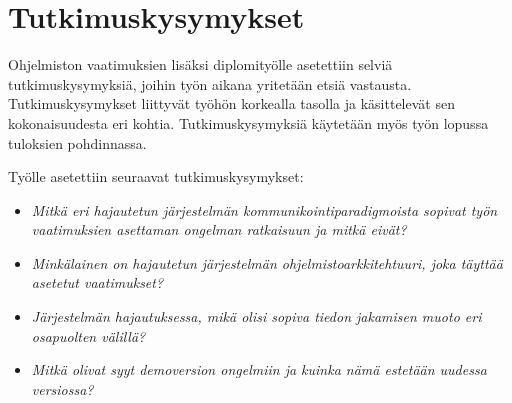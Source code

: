 \section{Tutkimuskysymykset}
Ohjelmiston vaatimuksien lisäksi diplomityölle asetettiin selviä tutkimuskysymyksiä, joihin työn aikana yritetään etsiä vastausta. Tutkimuskysymykset liittyvät työhön korkealla tasolla ja käsittelevät sen kokonaisuudesta eri kohtia. Tutkimuskysymyksiä käytetään myös työn lopussa tuloksien pohdinnassa.

Työlle asetettiin seuraavat tutkimuskysymykset:
\begin{itemize}
	\item \emph{Mitkä eri hajautetun järjestelmän kommunikointiparadigmoista sopivat työn vaatimuksien asettaman ongelman ratkaisuun ja mitkä eivät?}
	\item \emph{Minkälainen on hajautetun järjestelmän ohjelmistoarkkitehtuuri, joka täyttää asetetut vaatimukset?}
	\item \emph{Järjestelmän hajautuksessa, mikä olisi sopiva tiedon jakamisen muoto eri osapuolten välillä?}
	\item \emph{Mitkä olivat syyt demoversion ongelmiin ja kuinka nämä estetään uudessa versiossa?}
\end{itemize}